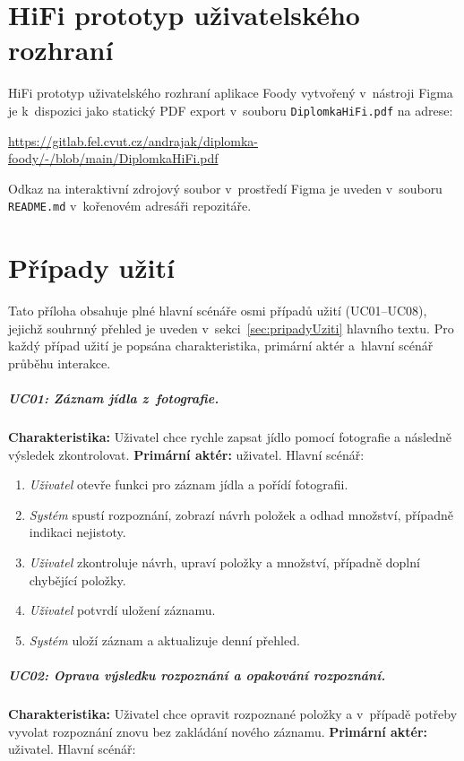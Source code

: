 \chapter{HiFi prototyp uživatelského rozhraní}
\label{app:hifi}

HiFi prototyp uživatelského rozhraní aplikace Foody vytvořený v~nástroji Figma je k~dispozici jako statický PDF export v~souboru \texttt{DiplomkaHiFi.pdf} na adrese:

\begin{center}
\url{https://gitlab.fel.cvut.cz/andrajak/diplomka-foody/-/blob/main/DiplomkaHiFi.pdf}
\end{center}

Odkaz na interaktivní zdrojový soubor v~prostředí Figma je uveden v~souboru \texttt{README.md} v~kořenovém adresáři repozitáře.

\chapter{Případy užití}
\label{app:pripadyUziti}

Tato příloha obsahuje plné hlavní scénáře osmi případů užití (UC01--UC08), jejichž souhrnný přehled je uveden v~sekci~\ref{sec:pripadyUziti} hlavního textu.
Pro každý případ užití je popsána charakteristika, primární aktér a~hlavní scénář průběhu interakce.

\paragraph{UC01: Záznam jídla z~fotografie.}
\textbf{Charakteristika:} Uživatel chce rychle zapsat jídlo pomocí fotografie a následně výsledek zkontrolovat.
\textbf{Primární aktér:} uživatel.
Hlavní scénář:

\begin{enumerate}
	\item \emph{Uživatel} otevře funkci pro záznam jídla a pořídí fotografii.
	\item \emph{Systém} spustí rozpoznání, zobrazí návrh položek a odhad množství, případně indikaci nejistoty.
	\item \emph{Uživatel} zkontroluje návrh, upraví položky a množství, případně doplní chybějící položky.
	\item \emph{Uživatel} potvrdí uložení záznamu.
	\item \emph{Systém} uloží záznam a aktualizuje denní přehled.
\end{enumerate}

\paragraph{UC02: Oprava výsledku rozpoznání a opakování rozpoznání.}
\textbf{Charakteristika:} Uživatel chce opravit rozpoznané položky a v~případě potřeby vyvolat rozpoznání znovu bez zakládání nového záznamu.
\textbf{Primární aktér:} uživatel.
Hlavní scénář:

